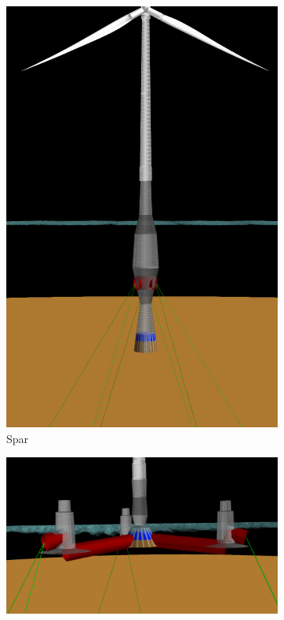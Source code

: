 \begin{figure}[htb]
  \begin{subfigure}[b]{0.29\linewidth}
    \centering \includegraphics[width=\linewidth]{figs/spar-cost1.png}
    \caption{Spar}
  \end{subfigure}
  \begin{subfigure}[b]{0.39\linewidth}
    \centering \includegraphics[width=\linewidth]{figs/semi-mass2.png}

\end{subfigure}
\end{figure}

